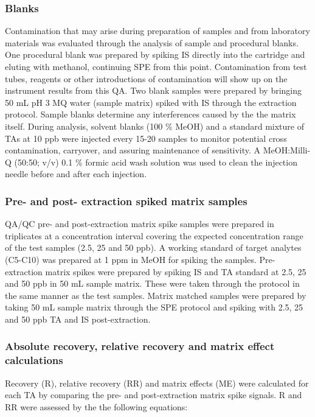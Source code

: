 \subsubsection{Blanks}
Contamination that may arise during preparation of samples and from laboratory materials was evaluated through the analysis of sample and procedural blanks. One procedural blank was prepared by spiking IS directly into the cartridge and eluting with methanol, continuing SPE from this point. Contamination from test tubes, reagents or other introductions of contamination will show up on the instrument results from this QA. Two blank samples were prepared by bringing 50 mL pH 3 MQ water (sample matrix) spiked with IS through the extraction protocol. Sample blanks determine any interferences caused by the the matrix itself. During analysis, solvent blanks (100 \% MeOH) and a standard mixture of TAs at 10 ppb were injected every 15-20 samples to monitor potential cross contamination, carryover, and assuring maintenance of sensitivity. A MeOH:Milli-Q (50:50; v/v) 0.1 \% formic acid wash solution was used to clean the injection needle before and after each injection.

\subsubsection{Pre- and post- extraction spiked matrix samples}
QA/QC pre- and post-extraction matrix spike samples were prepared in triplicates at a concentration interval covering the expected concentration range of the test samples (2.5, 25 and 50 ppb). A working standard of target analytes (C5-C10) was prepared at 1 ppm in MeOH for spiking the samples. Pre-extraction matrix spikes were prepared by spiking IS and TA standard at 2.5, 25 and 50 ppb in 50 mL sample matrix. These were taken through the protocol in the same manner as the test samples. Matrix matched samples were prepared by taking 50 mL sample matrix through the SPE protocol and spiking with 2.5, 25 and 50 ppb TA and IS post-extraction. 

\subsubsection{Absolute recovery, relative recovery and matrix effect calculations}
Recovery (R), relative recovery (RR) and matrix effects (ME) were calculated for each TA by comparing the pre- and post-extraction matrix spike signals. R and RR were assessed by the the following equations:


